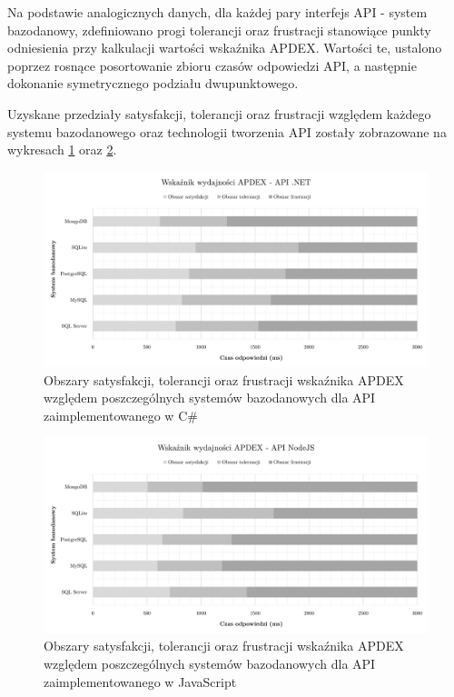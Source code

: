 Na podstawie analogicznych danych, dla każdej pary interfejs API - system bazodanowy, zdefiniowano progi tolerancji oraz frustracji stanowiące punkty odniesienia przy kalkulacji wartości wskaźnika APDEX. Wartości te, ustalono poprzez rosnące posortowanie zbioru czasów odpowiedzi API, a następnie dokonanie symetrycznego podziału dwupunktowego.

Uzyskane przedziały satysfakcji, tolerancji oraz frustracji względem każdego systemu bazodanowego oraz technologii tworzenia API zostały zobrazowane na wykresach \ref{fig:apdex-dotnet} oraz \ref{fig:apdex-nodejs}.

\begin{figure}[htb]
    \centering
     \includegraphics[width=\linewidth]{rys05/apdex-dotnet.pdf}
    \caption{Obszary satysfakcji, tolerancji oraz frustracji wskaźnika APDEX względem poszczególnych systemów bazodanowych dla API zaimplementowanego w C\#}
    \label{fig:apdex-dotnet}
\end{figure}

\begin{figure}[htb]
    \centering
     \includegraphics[width=\linewidth]{rys05/apdex-nodejs.pdf}
    \caption{Obszary satysfakcji, tolerancji oraz frustracji wskaźnika APDEX względem poszczególnych systemów bazodanowych dla API zaimplementowanego w JavaScript}
    \label{fig:apdex-nodejs}
\end{figure}


